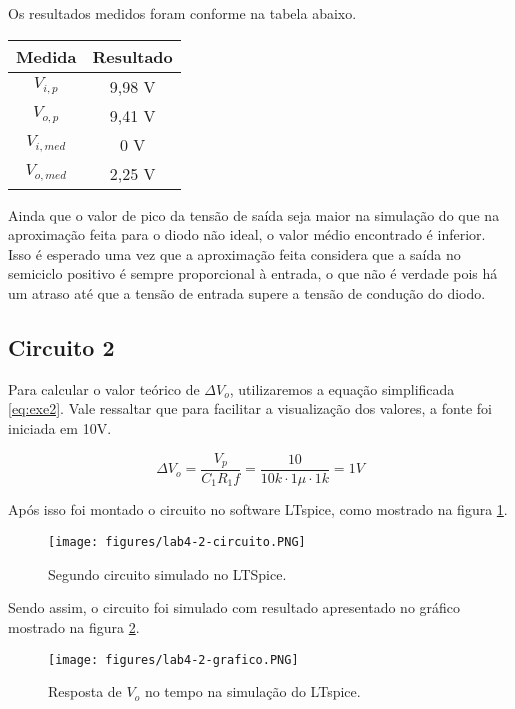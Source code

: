 \documentclass[a4paper]{report}
\begin{document}
Os resultados medidos foram conforme na tabela abaixo.

\begin{table}[H]
    \centering
    \begin{tabular}{c | c}
	Medida & Resultado \\
	\hline
	$V_{i,p}$ & 9,98 V \\
	$V_{o,p}$ & 9,41 V \\
	$V_{i,med}$ & 0 V \\
	$V_{o,med}$ & 2,25 V
    \end{tabular}
\end{table}

Ainda que o valor de pico da tensão de saída seja maior na simulação do que na aproximação feita para o diodo não ideal, o valor médio encontrado é inferior. Isso é esperado uma vez que a aproximação feita considera que a saída no semiciclo positivo é sempre proporcional à entrada, o que não é verdade pois há um atraso até que a tensão de entrada supere a tensão de condução do diodo.

\subsection{Circuito 2}

Para calcular o valor teórico de $\Delta V_o$, utilizaremos a equação simplificada \ref{eq:exe2}. Vale ressaltar que para facilitar a visualização dos valores, a fonte foi iniciada em 10V.

\begin{equation}
    \label{eq:exe2}
    \Delta V_o = \frac{V_p}{C_1R_1f} = \frac{10}{10k \cdot 1\mu \cdot 1k} = 1V
\end{equation}

Após isso foi montado o circuito no software LTspice, como mostrado na figura \ref{fig:figures-lab4-2-circuito-png}.

\begin{figure}[H]
    \centering
    \texttt{[image: figures/lab4-2-circuito.PNG]}
    \caption{Segundo circuito simulado no LTSpice.}
    \label{fig:figures-lab4-2-circuito-png}
\end{figure}

Sendo assim, o circuito foi simulado com resultado apresentado no gráfico mostrado na figura \ref{fig:figures-lab4-2-grafico-png}.

\begin{figure}[H]
    \centering
    \texttt{[image: figures/lab4-2-grafico.PNG]}
    \caption{Resposta de $V_o$ no tempo na simulação do LTspice.}
    \label{fig:figures-lab4-2-grafico-png}
\end{figure}
\end{document}
